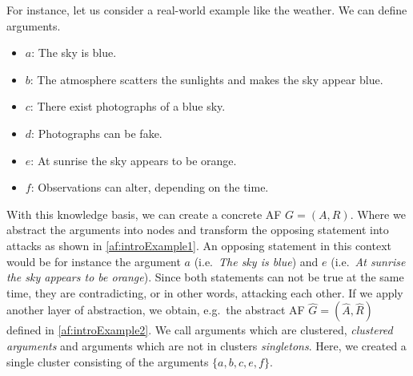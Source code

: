 For instance, let us consider a real-world example like the weather. We can define arguments.

\begin{itemize}
    \item $a$: The sky is blue.
    \item $b$: The atmosphere scatters the sunlights and makes the sky appear blue.
    \item $c$: There exist photographs of a blue sky.
    \item $d$: Photographs can be fake.
    \item $e$: At sunrise the sky appears to be orange.
    \item $f$: Observations can alter, depending on the time.
\end{itemize}

With this knowledge basis, we can create a concrete AF $G=(A, R)$. Where we abstract the arguments into nodes and transform the opposing statement into attacks as shown in \cref{af:introExample1}. An opposing statement in this context would be for instance the argument $a$ (i.e.\ \emph{The sky is blue}) and $e$ (i.e.\ \emph{At sunrise the sky appears to be orange}). Since both statements can not be true at the same time, they are contradicting, or in other words, attacking each other. If we apply another layer of abstraction, we obtain, e.g.\ the abstract AF $\hat{G}=(\hat{A}, \hat{R})$ defined in \cref{af:introExample2}. We call arguments which are clustered, \emph{clustered arguments} and arguments which are not in clusters \emph{singletons}. Here, we created a single cluster consisting of the arguments $\{a, b, c, e, f\}$.



